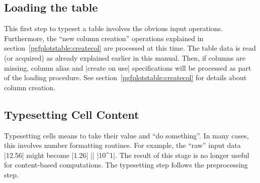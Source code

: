 \subsection{Loading the table}
This first step to typeset a table involves the obvious input operations. Furthermore, the ``new column creation'' operations explained in section~\ref{pgfplotstable:createcol} are processed at this time. The table data is read (or acquired) as already explained earlier in this manual. Then, if columns are missing, column alias and |create on use| specifications will be processed as part of the loading procedure. See section~\ref{pgfplotstable:createcol} for details about column creation.

\subsection{Typesetting Cell Content}
Typesetting cells means to take their value and ``do something''. In many cases, this involves number formatting routines. For example, the ``raw'' input data |12.56| might become |1.26| |\cdot| |10^1|. The result of this stage is no longer useful for content-based computations. The typesetting step follows the preprocessing step.

